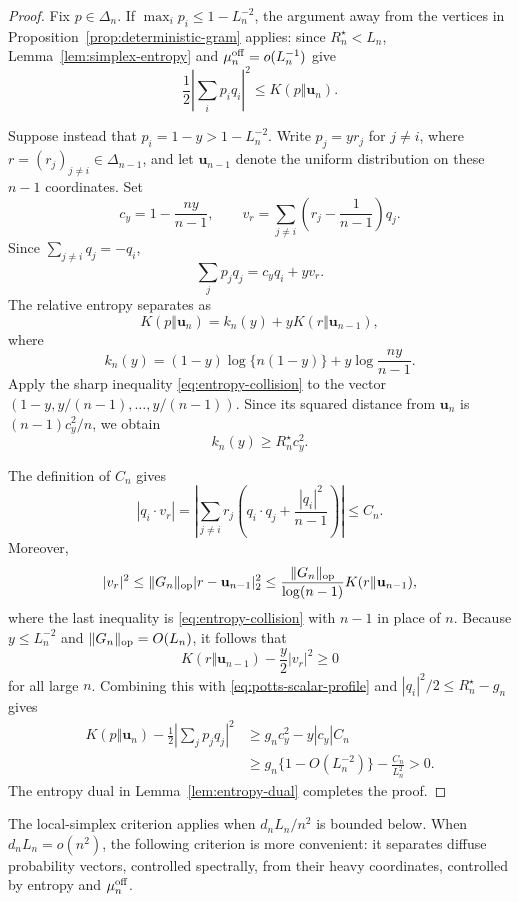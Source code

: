 \begin{proof}
Fix \(p\in\Delta_n\).  If
\(\max_i p_i\le1-L_n^{-2}\), the argument away from the vertices in
Proposition~\ref{prop:deterministic-gram} applies: since
\(R_n^\star<L_n\), Lemma~\ref{lem:simplex-entropy} and
\(\mu_n^{\rm off}=o(L_n^{-1})\) give
\[
 \frac12\left|\sum_i p_iq_i\right|^2\le K(p\Vert \mathbf u_n).
\]

Suppose instead that \(p_i=1-y>1-L_n^{-2}\).  Write
\(p_j=yr_j\) for \(j\ne i\), where
\(r=(r_j)_{j\ne i}\in\Delta_{n-1}\), and let \(\mathbf u_{n-1}\) denote the
uniform distribution on these \(n-1\) coordinates.  Set
\[
 c_y=1-\frac{ny}{n-1},
 \qquad
 v_r=\sum_{j\ne i}\left(r_j-\frac1{n-1}\right)q_j.
\]
Since \(\sum_{j\ne i}q_j=-q_i\),
\[
 \sum_jp_jq_j=c_yq_i+yv_r.
\]
The relative entropy separates as
\[
 K(p\Vert \mathbf u_n)
 =
 k_n(y)+yK(r\Vert \mathbf u_{n-1}),
\]
where
\[
 k_n(y)
 =(1-y)\log\{n(1-y)\}
 +y\log\frac{ny}{n-1}.
\]
Apply the sharp inequality \eqref{eq:entropy-collision} to the vector
\((1-y,y/(n-1),\ldots,y/(n-1))\).  Since its squared distance from
\(\mathbf u_n\) is \((n-1)c_y^2/n\), we obtain
\begin{equation}
\label{eq:potts-scalar-profile}
 k_n(y)\ge R_n^\star c_y^2.
\end{equation}

The definition of \(C_n\) gives
\[
 |q_i\cdot v_r|
 =
 \left|
  \sum_{j\ne i}r_j
  \left(q_i\cdot q_j+\frac{|q_i|^2}{n-1}\right)
 \right|
 \le C_n.
\]
Moreover,
\[
 |v_r|^2
 \le\|G_n\|_{\rm op}|r-\mathbf u_{n-1}|_2^2
 \le\frac{\|G_n\|_{\rm op}}{\log(n-1)}
       K(r\Vert \mathbf u_{n-1}),
\]
where the last inequality is \eqref{eq:entropy-collision} with \(n-1\)
in place of \(n\).  Because \(y\le L_n^{-2}\) and
\(\|G_n\|_{\rm op}=O(L_n)\), it follows that
\[
 K(r\Vert \mathbf u_{n-1})-\frac y2|v_r|^2\ge0
\]
for all large \(n\).  Combining this with
\eqref{eq:potts-scalar-profile} and
\(|q_i|^2/2\le R_n^\star-g_n\) gives
\begin{align*}
 K(p\Vert \mathbf u_n)
 -\frac12\left|\sum_jp_jq_j\right|^2
 &\ge
 g_nc_y^2-y|c_y|C_n\\
 &\ge
 g_n\{1-O(L_n^{-2})\}-\frac{C_n}{L_n^2}>0.
\end{align*}
The entropy dual in Lemma~\ref{lem:entropy-dual} completes the proof.
\end{proof}

The local-simplex criterion applies when \(d_nL_n/n^2\) is bounded below.
When \(d_nL_n=o(n^2)\), the following criterion is more convenient: it
separates diffuse probability vectors, controlled spectrally, from their
heavy coordinates, controlled by entropy and \(\mu_n^{\rm off}\).


